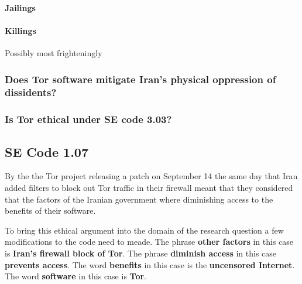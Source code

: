 \documentclass[11pt]{article}
\begin{document}
\begin{multicols}{2}
\paragraph{Jailings}


\paragraph{Killings}
Possibly most frighteningly 


\subsubsection{Does Tor software mitigate Iran's physical oppression of
dissidents?}


\subsubsection{Is Tor ethical under SE code 3.03?}


\subsection{SE Code 1.07} 

\newline

By the the Tor project releasing a patch on September 14 the same day that Iran
added filters to block out Tor traffic in their firewall meant that they
considered that the factors of the Iranian government where diminishing access
to the benefits of their software.

To bring this ethical argument into the domain of the research question a few
modifications to the code need to meade. The phrase \textbf{other factors} in
this case is \textbf{Iran's firewall block of Tor}. The phrase \textbf{diminish
access} in this case \textbf{prevents access}. The word \textbf{benefits} in
this case is the \textbf{uncensored Internet}. The word \textbf{software} in this
case is \textbf{Tor}.


\end{multicols}
\end{document}
